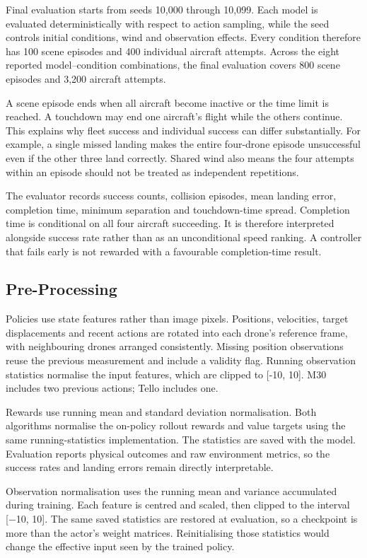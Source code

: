 Final evaluation starts from seeds 10,000 through 10,099. Each model is evaluated deterministically with respect to action sampling, while the seed controls initial conditions, wind and observation effects. Every condition therefore has 100 scene episodes and 400 individual aircraft attempts. Across the eight reported model--condition combinations, the final evaluation covers 800 scene episodes and 3,200 aircraft attempts.

A scene episode ends when all aircraft become inactive or the time limit is reached. A touchdown may end one aircraft's flight while the others continue. This explains why fleet success and individual success can differ substantially. For example, a single missed landing makes the entire four-drone episode unsuccessful even if the other three land correctly. Shared wind also means the four attempts within an episode should not be treated as independent repetitions.

The evaluator records success counts, collision episodes, mean landing error, completion time, minimum separation and touchdown-time spread. Completion time is conditional on all four aircraft succeeding. It is therefore interpreted alongside success rate rather than as an unconditional speed ranking. A controller that fails early is not rewarded with a favourable completion-time result.

\hypertarget{pre-processing}{%
\subsection{Pre-Processing}\label{pre-processing}}

Policies use state features rather than image pixels. Positions, velocities, target displacements and recent actions are rotated into each drone's reference frame, with neighbouring drones arranged consistently. Missing position observations reuse the previous measurement and include a validity flag. Running observation statistics normalise the input features, which are clipped to {[}-10, 10{]}. M30 includes two previous actions; Tello includes one.

Rewards use running mean and standard deviation normalisation. Both algorithms normalise the on-policy rollout rewards and value targets using the same running-statistics implementation. The statistics are saved with the model. Evaluation reports physical outcomes and raw environment metrics, so the success rates and landing errors remain directly interpretable.

Observation normalisation uses the running mean and variance accumulated during training. Each feature is centred and scaled, then clipped to the interval {[}−10, 10{]}. The same saved statistics are restored at evaluation, so a checkpoint is more than the actor's weight matrices. Reinitialising those statistics would change the effective input seen by the trained policy.

